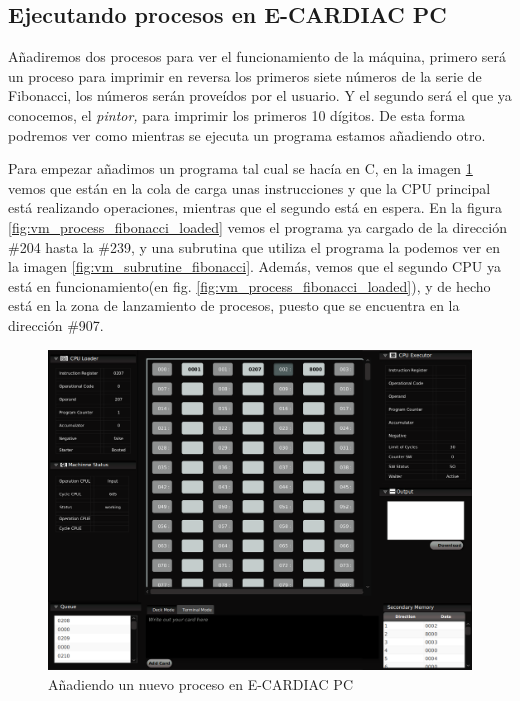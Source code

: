 \documentclass[letterpaper,12pt,oneside]{book}
\begin{document}
			\clearpage	
			
		\subsection{Ejecutando procesos en E-CARDIAC PC}		
			
			Añadiremos dos procesos para ver el funcionamiento de la máquina, primero será un proceso para imprimir en reversa los primeros
			siete números de la serie de Fibonacci, los números serán proveídos por el usuario. Y el segundo será el que ya conocemos, el
			\textit{pintor,} para imprimir los primeros 10 dígitos. De esta forma podremos ver como mientras se ejecuta un programa estamos añadiendo otro.
		
			
			Para empezar añadimos un programa tal cual se hacía en C, en la imagen \ref{fig:vm_adding_new_process_fibonacci} vemos que están
			en la cola de carga unas instrucciones y que la CPU principal está realizando operaciones, mientras que el segundo
			está en espera. En la figura \ref{fig:vm_process_fibonacci_loaded} vemos el programa ya cargado de la dirección \#204 hasta la \#239,
			y una subrutina que utiliza el programa la podemos ver en la imagen \ref{fig:vm_subrutine_fibonacci}. Además,
			vemos que el segundo CPU ya está en funcionamiento(en fig.  \ref{fig:vm_process_fibonacci_loaded}), y de hecho está en la zona de lanzamiento de procesos, puesto que se encuentra
			en la dirección \#907.
			
	       \begin{figure}[h]		
				\centering
				\includegraphics[scale=0.35]{media/Paralela/vm_adding_new_process_fibonacci_cut.png}
				\caption{Añadiendo un nuevo proceso en E-CARDIAC PC}
				\label{fig:vm_adding_new_process_fibonacci}
			\end{figure}			
   
\end{document}
